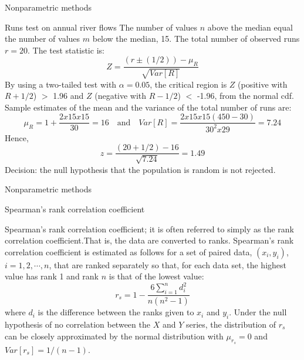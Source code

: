 \documentclass[8pt]{beamer}
\renewcommand{\emph}[1]{\textcolor{myorange}{#1}}
\begin{document}
\begin{frame}{Nonparametric methods}

    \begin{exampleblock}{Runs test on annual river flows}
  The number of values $n$ \emph{above the median} equal the number of values $m$ \emph{below the median}, 15. The total number of observed \emph{runs} $r = 20$. The test statistic is:
  \[
      Z = \frac{(r \pm (1/2) )- \mu_R}{\sqrt{Var[R]}}
      \]
      By using a two-tailed test with $\alpha = 0.05$, the \emph{critical region} is $Z$ (positive with $R + 1/2$) $>$ 1.96 and $Z$ (negative with $R - 1/2$) $<$ -1.96, from  the \emph{normal cdf}. Sample estimates of the \emph{mean} and the \emph{variance} of the total number of runs are:
      \[
          \mu_R = 1 + \frac{2 x 15 x 15}{30} = 16 \quad \text{and} \quad Var[R] = \frac{2 x 15 x 15(450-30)}{30^2 x 29} = 7.24
      \]
      Hence,
      \[
          z = \frac{(20 + 1/2) - 16}{\sqrt{7.24}} = 1.49
      \]
\emph{Decision: the null hypothesis that the population is random is not rejected}.
    \end{exampleblock}
    \end{frame}

\begin{frame}{Nonparametric methods}

    \begin{block}{Spearman’s rank correlation coefficient}
    \end{block}
    \alert{Spearman's rank correlation coefficient}; it is often referred to simply as the \emph{rank correlation coefficient}.That is, the data are converted to ranks.  \emph{Spearman's rank correlation coefficient} is estimated as follows for a set of paired data, $(x_i , y_i)$, $i = 1, 2, \cdots, n$, that are ranked separately so that, for each data set, the highest value has rank 1 and rank $n$ is that of the lowest value:
    \[
        r_s = 1 - \frac{6\sum_{i=1}^n d_i^2}{n(n^2 -1)}
    \]
    where $d_i$ is the difference between the ranks given to $x_i$ and $y_i$. Under the \emph{null hypothesis} of no correlation between the $X$ and $Y$ series, the distribution of $r_s$ can be closely approximated by the \emph{normal distribution} with $\mu_{r_s} = 0$ and $Var[r_s ] = 1/(n-1)$.
    \end{frame}

\end{document}

